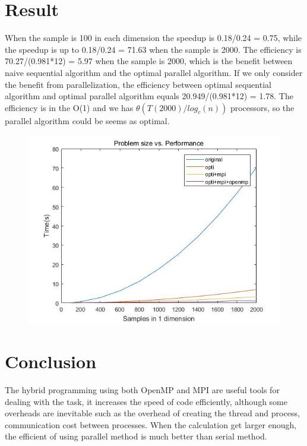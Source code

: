 \documentclass[letterpaper,10pt]{article}
\begin{document}
\section{Result}
When the sample is 100 in each dimension the speedup is 0.18/0.24 = 0.75, while the speedup is up to 0.18/0.24 = 71.63 when the sample is 2000. The efficiency is 70.27/(0.981*12) = 5.97 when the sample is 2000, which is the benefit between naive sequential algorithm and the optimal parallel algorithm. If we only consider the benefit from parallelization, the efficiency between optimal sequential algorithm and optimal parallel algorithm equals 20.949/(0.981*12) = 1.78. The efficiency is in the O(1) and we has $\theta(T(2000)/log_c(n))$ processors, so the parallel algorithm could be seems as optimal.
\begin{figure}
\includegraphics[scale=0.8]{untitled}
\end{figure}

\section{Conclusion}
The hybrid programming using both OpenMP and MPI are useful tools for dealing with the task, it increases the speed of code efficiently, although some overheads are inevitable such as the overhead of creating the thread and process, communication cost between processes. When the calculation get larger enough, the efficient of using parallel method is much better than serial method.
\end{document}
